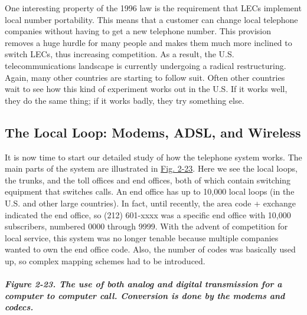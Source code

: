 \documentclass[b5paper,11pt]{memoir}
\begin{document}
One interesting property of the 1996 law is the requirement that LECs
implement local number portability. This means that a customer can
change local telephone companies without having to get a new telephone
number. This provision removes a huge hurdle for many people and makes
them much more inclined to switch LECs, thus increasing competition. As
a result, the U.S. telecommunications landscape is currently undergoing
a radical restructuring. Again, many other countries are starting to
follow suit. Often other countries wait to see how this kind of
experiment works out in the U.S. If it works well, they do the same
thing; if it works badly, they try something else.

\protect\hypertarget{0130661023_ch02lev1sec5.htmlux5cux23ch02lev2sec19}{}{}

\subsection{The Local Loop: Modems, ADSL, and Wireless}

It is now time to start our detailed study of how the telephone system
works. The main parts of the system are illustrated in
\protect\hyperlink{0130661023_ch02lev1sec5.htmlux5cux23ch02fig23}{Fig.
2-23}. Here we see the local loops, the trunks, and the toll offices and
end offices, both of which contain switching equipment that switches
calls. An end office has up to 10,000 local loops (in the U.S. and other
large countries). In fact, until recently, the area code + exchange
indicated the end office, so (212) 601-xxxx was a specific end office
with 10,000 subscribers, numbered 0000 through 9999. With the advent of
competition for local service, this system was no longer tenable because
multiple companies wanted to own the end office code. Also, the number
of codes was basically used up, so complex mapping schemes had to be
introduced.

\subparagraph[Figure 2-23. The use of both analog and digital
transmission for a computer to computer call. Conversion is done by the
modems and
codecs.]{\texorpdfstring{\protect\hypertarget{0130661023_ch02lev1sec5.htmlux5cux23ch02fig23}{}{}Figure
2-23. The use of both analog and digital transmission for a computer to
computer call. Conversion is done by the modems and
codecs.}{Figure 2-23. The use of both analog and digital transmission for a computer to computer call. Conversion is done by the modems and codecs.}}

\end{document}
